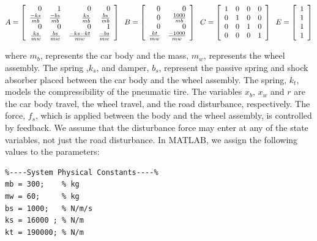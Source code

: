 \documentclass{amsart}
\theoremstyle{definition}
\theoremstyle{remark}
\numberwithin{equation}{section}
\begin{document}
\begin{equation}
\begin{aligned}
A = \displaystyle \left [ \begin{array}{rrrr}
0 & 1 & 0 & 0 \\
\frac{-ks}{mb} & \frac{-bs}{mb} & \frac{ks}{mb} & \frac{bs}{mb} \\
 0 & 0 & 0 & 1 \\
 \frac{ks}{mw} & \frac{bs}{mw} & \frac{-ks-kt}{mw} & \frac{-bs}{mw}
 \end{array} \right ] \hspace{2mm} B= \displaystyle \left [ \begin{array}{rr}
 0 & 0\\
 0 & \frac{1000}{mb}\\
 0 & 0 \\
 \frac{kt}{mw} & \frac{-1000}{mw}
 \end{array} \right ] \hspace{2mm} C = \displaystyle \left [ \begin{array}{rrrr}
1 & 0 & 0 & 0 \\
0 & 1 & 0 & 0 \\
0 & 0 & 1 & 0 \\
0 & 0 & 0 & 1
\end{array} \right ] \hspace{2mm} E = \displaystyle \left [ \begin{array}{r}
1\\
1\\
1\\
1 \end{array} \right ]
\end{aligned}
\end{equation}

where $m_b$, represents the car body and the mass, $m_w$, represents the wheel assembly. The spring ,$k_s$, and damper, $b_s$, represent the passive spring and shock absorber placed between the car body and the wheel assembly.  The spring, $k_t$, models the compressibility of the pneumatic tire. The variables $x_b$, $x_w$ and $r$ are the car body travel, the wheel travel, and the road disturbance, respectively.  The force, $f_s$, which is applied between the body and the wheel assembly, is controlled by feedback. We assume that the disturbance force may enter at any of the state variables, not just the road disturbance. In MATLAB, we assign the following values to the parameters:
\begin{verbatim}
%----System Physical Constants----%
mb = 300;    % kg
mw = 60;     % kg
bs = 1000;   % N/m/s
ks = 16000 ; % N/m
kt = 190000; % N/m
\end{verbatim}
\end{document}
